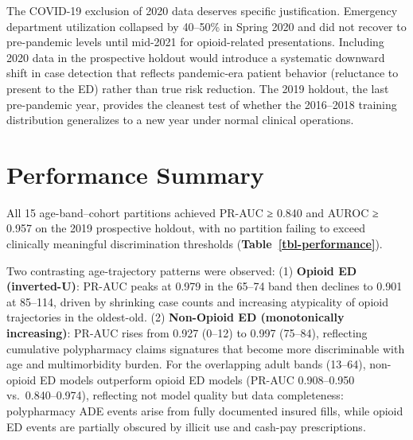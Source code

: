 \documentclass[
  12pt,
]{book}
\begin{document}
The COVID-19 exclusion of 2020 data deserves specific justification.
Emergency department utilization collapsed by 40--50\% in Spring 2020
and did not recover to pre-pandemic levels until mid-2021 for
opioid-related presentations. Including 2020 data in the prospective
holdout would introduce a systematic downward shift in case detection
that reflects pandemic-era patient behavior (reluctance to present to
the ED) rather than true risk reduction. The 2019 holdout, the last
pre-pandemic year, provides the cleanest test of whether the 2016--2018
training distribution generalizes to a new year under normal clinical
operations.

\section{Performance Summary}\label{performance-summary}

All 15 age-band--cohort partitions achieved PR-AUC ≥ 0.840 and AUROC ≥
0.957 on the 2019 prospective holdout, with no partition failing to
exceed clinically meaningful discrimination thresholds
(\textbf{Table~\ref{tbl-performance}}).

Two contrasting age-trajectory patterns were observed: (1)
\textbf{Opioid ED (inverted-U)}: PR-AUC peaks at 0.979 in the 65--74
band then declines to 0.901 at 85--114, driven by shrinking case counts
and increasing atypicality of opioid trajectories in the oldest-old. (2)
\textbf{Non-Opioid ED (monotonically increasing)}: PR-AUC rises from
0.927 (0--12) to 0.997 (75--84), reflecting cumulative polypharmacy
claims signatures that become more discriminable with age and
multimorbidity burden. For the overlapping adult bands (13--64),
non-opioid ED models outperform opioid ED models (PR-AUC 0.908--0.950
vs.~0.840--0.974), reflecting not model quality but data completeness:
polypharmacy ADE events arise from fully documented insured fills, while
opioid ED events are partially obscured by illicit use and cash-pay
prescriptions.
\end{document}
